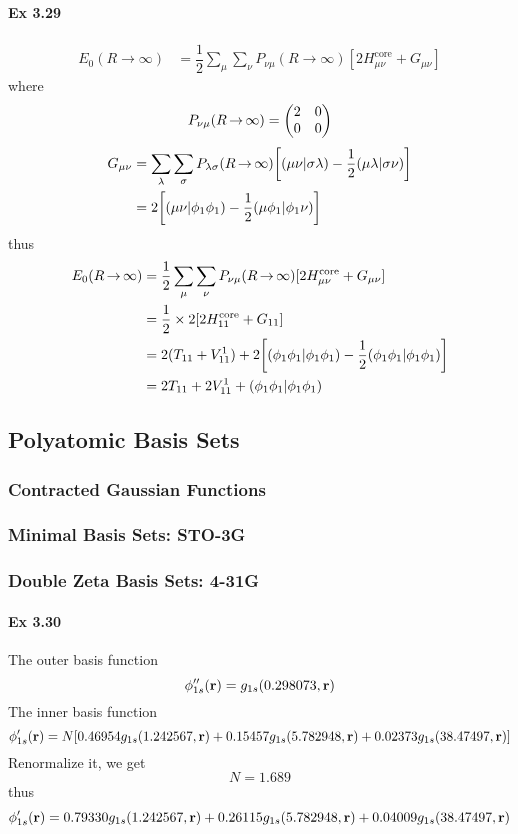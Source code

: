 \documentclass[a4paper]{article}
\DeclareMathOperator{\ra}{\rightarrow}
\DeclareMathOperator{\core}{\mathrm{core}}
\newcommand{\ex}[1]{\paragraph{Ex #1}}
\numberwithin{equation}{subsection}
\begin{document}
\ex{3.29}
\begin{align}
E_0(R\ra \infty) &= \dfrac{1}{2}\sum_\mu\sum_\nu P_{\nu\mu}(R\ra \infty) [2H_{\mu\nu}^{\core} + G_{\mu\nu}] 
\end{align}
where
\begin{equation}\label{key}
P_{\nu\mu}(R\ra \infty) = \mqty( 2 & 0\\ 0 & 0)
\end{equation}
\begin{align}\label{key}
G_{\mu\nu} &= \sum_\lambda\sum_\sigma P_{\lambda\sigma}(R\ra\infty) \qty[(\mu\nu|\sigma\lambda) - \dfrac{1}{2}(\mu\lambda|\sigma\nu)] \notag\\
&= 2\qty[(\mu\nu|\phi_1\phi_1) - \dfrac{1}{2}(\mu\phi_1|\phi_1\nu)]
\end{align}
thus
\begin{align}
E_0(R\ra \infty) &= \dfrac{1}{2}\sum_\mu\sum_\nu P_{\nu\mu}(R\ra \infty) [2H_{\mu\nu}^{\core} + G_{\mu\nu}] \notag\\
&= \dfrac{1}{2}\times 2[2H_{11}^{\core} + G_{11}] \notag\\
&= 2(T_{11} + V^1_{11}) + 2\qty[(\phi_1\phi_1|\phi_1\phi_1) - \dfrac{1}{2}(\phi_1\phi_1|\phi_1\phi_1)] \notag\\
&= 2T_{11} + 2V^1_{11} + (\phi_1\phi_1|\phi_1\phi_1) 
\end{align}

\subsection{Polyatomic Basis Sets}
\subsubsection{Contracted Gaussian Functions}
\subsubsection{Minimal Basis Sets: STO-3G}
\subsubsection{Double Zeta Basis Sets: 4-31G}
\ex{3.30}
The outer basis function
\begin{equation}\label{key}
\phi''_{1s}(\vb{r}) = g_{1s}(0.298073, \vb{r})
\end{equation}
The inner basis function
\begin{equation}\label{key}
\phi'_{1s}(\vb{r}) = N[0.46954 g_{1s}(1.242567, \vb{r}) 
+ 0.15457 g_{1s}(5.782948, \vb{r}) + 0.02373 g_{1s}(38.47497, \vb{r})]
\end{equation}
Renormalize it, we get
\begin{equation}\label{key}
N = 1.689
\end{equation}
thus
\begin{equation}\label{key}
\phi'_{1s}(\vb{r}) = 0.79330 g_{1s}(1.242567, \vb{r}) 
+ 0.26115 g_{1s}(5.782948, \vb{r}) + 0.04009 g_{1s}(38.47497, \vb{r})
\end{equation}
\end{document}
